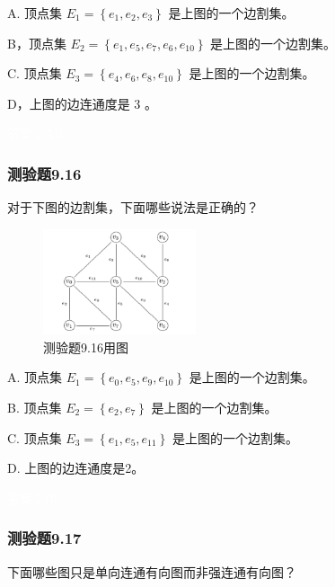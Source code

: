 \documentclass[UTF8, heading=true]{ctexart}
\begin{document}
A. 顶点集 $E_1=\left\{e_1, e_2, e_3\right\}$ 是上图的一个边割集。

B，顶点集 $E_2=\left\{e_1, e_5, e_7, e_6, e_{10}\right\}$ 是上图的一个边割集。

C. 顶点集 $E_3=\left\{e_4, e_6, e_8, e_{10}\right\}$ 是上图的一个边割集。

D，上图的边连通度是 3 。


\textcolor{white}{答案：AB}

\subsubsection{测验题9.16}

对于下图的边割集，下面哪些说法是正确的？

\begin{figure}[H]
    \centering
    \includegraphics[width=0.4\textwidth]{9.16.jpg} %
    \caption{测验题9.16用图}
\end{figure}

A. 顶点集 $E_1=\left\{e_0, e_5, e_9, e_{10}\right\}$ 是上图的一个边割集。

B. 顶点集 $E_2=\left\{e_2, e_7\right\}$ 是上图的一个边割集。

C. 顶点集 $E_3=\left\{e_1, e_5, e_{11}\right\}$ 是上图的一个边割集。

D. 上图的边连通度是2。

\textcolor{white}{答案：BC}

\subsubsection{测验题9.17}

下面哪些图只是单向连通有向图而非强连通有向图？
\end{document}
